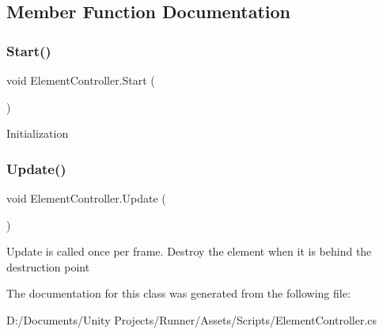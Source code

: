 \subsection{Member Function Documentation}
\mbox{\label{class_element_controller_afd67336e7c6bed51a83b74a6c62ee348}} 
\subsubsection{\texorpdfstring{Start()}{Start()}}
{\footnotesize\ttfamily void Element\+Controller.\+Start (\begin{DoxyParamCaption}{ }\end{DoxyParamCaption})\hspace{0.3cm}{\ttfamily [private]}}

Initialization \mbox{\label{class_element_controller_ada579475820b96bc8654ae02fa356578}} 
\subsubsection{\texorpdfstring{Update()}{Update()}}
{\footnotesize\ttfamily void Element\+Controller.\+Update (\begin{DoxyParamCaption}{ }\end{DoxyParamCaption})\hspace{0.3cm}{\ttfamily [private]}}

Update is called once per frame. Destroy the element when it is behind the destruction point 

The documentation for this class was generated from the following file\+:\begin{DoxyCompactItemize}
\item 
D\+:/\+Documents/\+Unity Projects/\+Runner/\+Assets/\+Scripts/Element\+Controller.\+cs\end{DoxyCompactItemize}
